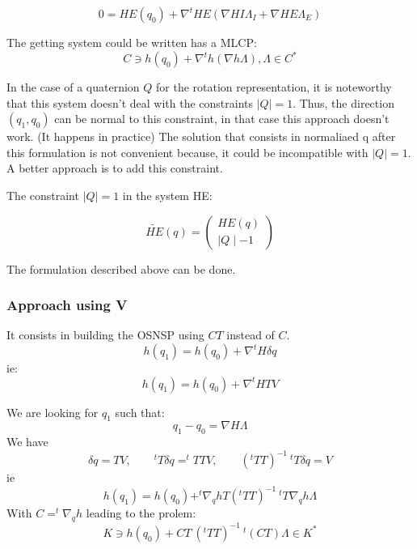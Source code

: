 \begin{equation}
  0=HE(q_0) + \nabla ^t HE (\nabla HI  \Lambda _I + \nabla HE \Lambda _E)
\end{equation}

The getting system could be written has a MLCP:
\begin{equation}
C \ni h(q_0)+ \nabla ^t h(\nabla h\Lambda) , \Lambda \in C^*
\end{equation}

In the case of a quaternion $Q$ for the rotation representation, it is noteworthy that this system doesn't deal with the constraints $\mid Q \mid = 1$. Thus, the direction $(q_1,q_0)$ can be normal to this constraint, in that case this approach doesn't work. (It happens in practice) The solution that consists in normaliaed q after this formulation is not convenient because, it could be incompatible with $\mid Q \mid = 1$. A better approach is to add this constraint.


The constraint $\mid Q \mid = 1$ in the system HE:

\begin{equation}
  \tilde {HE}(q)= \left(\begin{array}{l}
    HE(q)\\
    \mid Q \mid -1
\end{array}\right)
\end{equation}

The formulation described above can be done. 
\subsubsection{Approach using V}
It consists in building the OSNSP using $CT$ instead of $C$. 
\begin{equation}
\label{NE_projV}
h(q_1) = h(q_0)+\nabla ^t H \delta q
\end{equation}
ie:
\begin{equation}
\label{NE_projV}
h(q_1) = h(q_0)+\nabla ^t H T V
\end{equation}

We are looking for $q_1$ such that:
\begin{equation}
  q_1-q_0 = \nabla H \Lambda
\end{equation}
We have
\[\delta q=TV, \qquad ^tT\delta q=^tTTV, \qquad(^tTT)^{-1}~^tT\delta q=V\]
ie
\begin{equation}
  h(q_1)=h(q_0)+^t\nabla _q hT(^tTT)^{-1}~^tT\nabla _q h\Lambda
\end{equation}
With $C=^t\nabla _q h$ leading to the prolem:
\begin{equation}
K \ni h(q_0)+ CT~ (^tTT)^{-1}~ ^t(CT)   \Lambda \in K^*
\end{equation}
